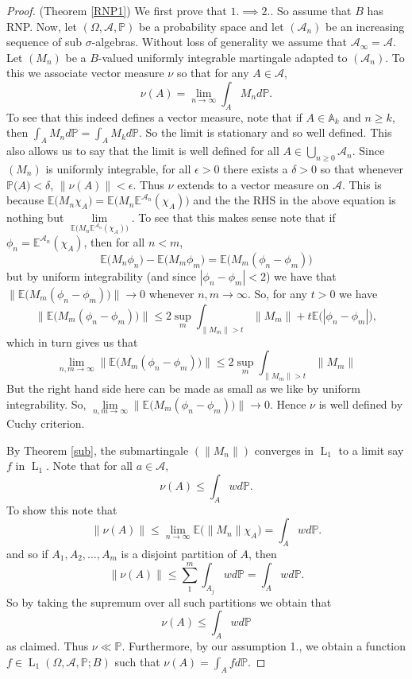 \documentclass[]{report}
\newcommand{\lp}[2]{\operatorname{L}_{#1}({#2})}
\newcommand*{\Normu}[1]{\lVert {#1} \rVert}
\newcommand*{\ext}[1]{\mathbb{E}\big({#1}\big)}
\renewcommand{\P}[1]{\mathbb{P}\big({#1}\big)}
\newcommand{\pspc}{\Omega,\mathcal{A},\mathbb{P}}
\newcommand*{\extop}[1]{\mathbb{E}^{{#1}}}
\begin{document}
\begin{proof}(Theorem \ref{RNP1})
	We first prove that $1. \implies 2.$. So assume that $B$ has RNP. Now, let $(\pspc)$ be a probability space and let $(\mathcal{A}_n)$ be an increasing sequence of sub $\sigma$-algebras. Without loss of generality we assume that $\mathcal{A}_{\infty}=\mathcal{A}$. Let $(M_n)$ be a $B$-valued uniformly integrable martingale adapted to $(\mathcal{A}_n)$. To this we associate vector measure $\nu$ so that for any $A\in \mathcal{A}$, 
	\[ \nu(A)= \lim\limits_{n\rightarrow \infty}\int_{A}M_nd\mathbb{P}. \]
	To see that this indeed defines a vector measure, note that if $A\in \mathbb{A}_k$ and $n\geq k$, then $\int_A M_nd\mathbb{P}=\int_A M_k d\mathbb{P}$. So the limit is stationary and so well defined. This also allows us to say that the limit is well defined for all $A \in \bigcup_{n\geq 0}\mathcal{A}_n$. Since $(M_n)$ is uniformly integrable, for all $\epsilon>0$ there exists a $\delta>0$ so that whenever $\P{A}<\delta$, $\Normu{\nu(A)}<\epsilon$. Thus $\nu$ extends to a vector measure on $\mathcal{A}$. This is because $\ext{M_n\chi_A}=\ext{M_n\extop{\mathcal{A}_n}(\chi_A)}$ and the the RHS in the above equation is nothing but $\lim\limits_{\ext{M_n\extop{\mathcal{A}_n}(\chi_A)}}$. To see that this makes sense note that if $\phi_n=\extop{\mathcal{A}_n}(\chi_A)$, then for all $n<m$, \[ \ext{M_n\phi_n}-\ext{M_m\phi_m}= \ext{M_m(\phi_n-\phi_m)} \]
	but by uniform integrability (and since $|\phi_n-\phi_m|<2$) we have that $\Normu{\ext{M_m(\phi_n-\phi_m)}}\rightarrow 0$ whenever $n,m\rightarrow \infty$. So, for any $t>0$ we have 
	\[ \Normu{\ext{M_m(\phi_n-\phi_m)}} \leq 2 \sup_m \int_{\Normu{M_m}>t}\Normu{M_m}+t \ext{|\phi_n-\phi_m|}, \] which in turn gives us that \[ \lim\limits_{n,m\rightarrow\infty}\Normu{\ext{M_m(\phi_n-\phi_m)}} \leq 2 \sup_m \int_{\Normu{M_m}>t}\Normu{M_m} \]But the right hand side here can be made as small as we like by uniform integrability. So, $ \lim\limits_{n,m\rightarrow\infty}\Normu{\ext{M_m(\phi_n-\phi_m)}}\rightarrow 0$. Hence $\nu$ is well defined by Cuchy criterion. 
	
	By Theorem \ref{sub}, the submartingale $(\Normu{M_n})$ converges in $\operatorname{L}_1$ to a limit say $f$ in $\operatorname{L}_1$. Note that for all $a\in \mathcal{A}$,
	\[ \nu(A)\leq \int_{A}wd\mathbb{P}. \]
	To show this note that \[ \Normu{\nu(A)} \leq \lim\limits_{n\rightarrow\infty}\ext{\Normu{M_n}\chi_A}=\int_A wd\mathbb{P}. \]
	and so if $A_1,A_2, \ldots,A_m$ is a disjoint partition of $A$, then \[ \Normu{\nu(A)} \leq \sum_{1}^{m}\int_{A_j} wd\mathbb{P}= \int_A wd\mathbb{P} . \]
	So by taking the supremum over all such partitions we obtain that \[ \nu(A)\leq \int_{A}wd\mathbb{P} \] as claimed. Thus $\nu \ll \mathbb{P}$. Furthermore, by our assumption 1., we obtain a function $f\in \lp{1}{\pspc;B}$ such that $\nu(A)=\int_Afd\mathbb{P}$. 
	

\end{proof}
\end{document}
